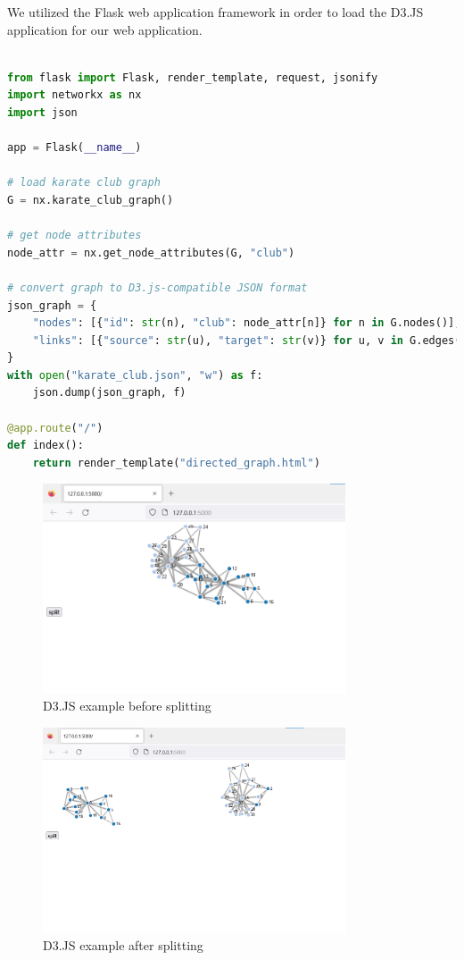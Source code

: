 \documentclass[12pt]{article}
\begin{document}
We utilized the Flask web application framework in order to load the D3.JS application for our web application.

\begin{lstlisting}[language=Python, caption=Function to create app.py file using Flask Framework]

from flask import Flask, render_template, request, jsonify
import networkx as nx
import json

app = Flask(__name__)

# load karate club graph
G = nx.karate_club_graph()

# get node attributes
node_attr = nx.get_node_attributes(G, "club")

# convert graph to D3.js-compatible JSON format
json_graph = {
    "nodes": [{"id": str(n), "club": node_attr[n]} for n in G.nodes()],
    "links": [{"source": str(u), "target": str(v)} for u, v in G.edges()]
}
with open("karate_club.json", "w") as f:
    json.dump(json_graph, f)

@app.route("/")
def index():
    return render_template("directed_graph.html")
\end{lstlisting}

\begin{figure}[h]
\caption{D3.JS example before splitting}
\centering
\includegraphics[width=0.80\textwidth]{Figure_16.png}
\end{figure}

\begin{figure}[h]
\caption{D3.JS example after splitting}
\centering
\includegraphics[width=0.80\textwidth]{Figure_17.png}
\end{figure}
\end{document}

